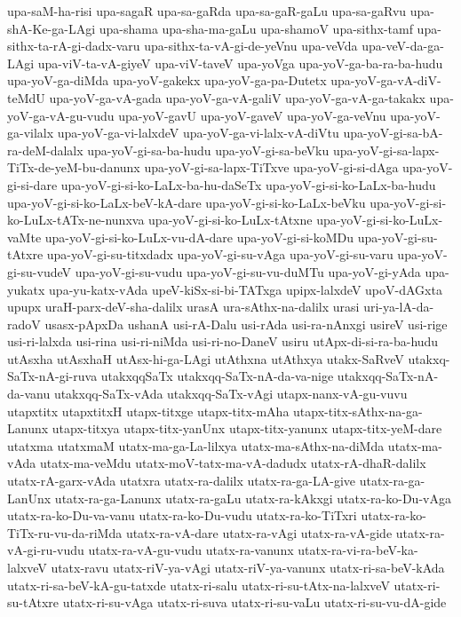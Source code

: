 {upa-saM-ha-risi
upa-sagaR
upa-sa-gaRda
upa-sa-gaR-gaLu
upa-sa-gaRvu
upa-shA-Ke-ga-LAgi
upa-shama
upa-sha-ma-gaLu
upa-shamoV
upa-sithx-tamf
upa-sithx-ta-rA-gi-dadx-varu
upa-sithx-ta-vA-gi-de-yeVnu
upa-veVda
upa-veV-da-ga-LAgi
upa-viV-ta-vA-giyeV
upa-viV-taveV
upa-yoVga
upa-yoV-ga-ba-ra-ba-hudu
upa-yoV-ga-diMda
upa-yoV-gakekx
upa-yoV-ga-pa-Dutetx
upa-yoV-ga-vA-diV-teMdU
upa-yoV-ga-vA-gada
upa-yoV-ga-vA-galiV
upa-yoV-ga-vA-ga-takakx
upa-yoV-ga-vA-gu-vudu
upa-yoV-gavU
upa-yoV-gaveV
upa-yoV-ga-veVnu
upa-yoV-ga-vilalx
upa-yoV-ga-vi-lalxdeV
upa-yoV-ga-vi-lalx-vA-diVtu
upa-yoV-gi-sa-bA-ra-deM-dalalx
upa-yoV-gi-sa-ba-hudu
upa-yoV-gi-sa-beVku
upa-yoV-gi-sa-lapx-TiTx-de-yeM-bu-danunx
upa-yoV-gi-sa-lapx-TiTxve
upa-yoV-gi-si-dAga
upa-yoV-gi-si-dare
upa-yoV-gi-si-ko-LaLx-ba-hu-daSeTx
upa-yoV-gi-si-ko-LaLx-ba-hudu
upa-yoV-gi-si-ko-LaLx-beV-kA-dare
upa-yoV-gi-si-ko-LaLx-beVku
upa-yoV-gi-si-ko-LuLx-tATx-ne-nunxva
upa-yoV-gi-si-ko-LuLx-tAtxne
upa-yoV-gi-si-ko-LuLx-vaMte
upa-yoV-gi-si-ko-LuLx-vu-dA-dare
upa-yoV-gi-si-koMDu
upa-yoV-gi-su-tAtxre
upa-yoV-gi-su-titxdadx
upa-yoV-gi-su-vAga
upa-yoV-gi-su-varu
upa-yoV-gi-su-vudeV
upa-yoV-gi-su-vudu
upa-yoV-gi-su-vu-duMTu
upa-yoV-gi-yAda
upa-yukatx
upa-yu-katx-vAda
upeV-kiSx-si-bi-TATxga
upipx-lalxdeV
upoV-dAGxta
upupx
uraH-parx-deV-sha-dalilx
urasA
ura-sAthx-na-dalilx
urasi
uri-ya-lA-da-radoV
usasx-pApxDa
ushanA
usi-rA-Dalu
usi-rAda
usi-ra-nAnxgi
usireV
usi-rige
usi-ri-lalxda
usi-rina
usi-ri-niMda
usi-ri-no-DaneV
usiru
utApx-di-si-ra-ba-hudu
utAsxha
utAsxhaH
utAsx-hi-ga-LAgi
utAthxna
utAthxya
utakx-SaRveV
utakxq-SaTx-nA-gi-ruva
utakxqqSaTx
utakxqq-SaTx-nA-da-va-nige
utakxqq-SaTx-nA-da-vanu
utakxqq-SaTx-vAda
utakxqq-SaTx-vAgi
utapx-nanx-vA-gu-vuvu
utapxtitx
utapxtitxH
utapx-titxge
utapx-titx-mAha
utapx-titx-sAthx-na-ga-Lanunx
utapx-titxya
utapx-titx-yanUnx
utapx-titx-yanunx
utapx-titx-yeM-dare
utatxma
utatxmaM
utatx-ma-ga-La-lilxya
utatx-ma-sAthx-na-diMda
utatx-ma-vAda
utatx-ma-veMdu
utatx-moV-tatx-ma-vA-dadudx
utatx-rA-dhaR-dalilx
utatx-rA-garx-vAda
utatxra
utatx-ra-dalilx
utatx-ra-ga-LA-give
utatx-ra-ga-LanUnx
utatx-ra-ga-Lanunx
utatx-ra-gaLu
utatx-ra-kAkxgi
utatx-ra-ko-Du-vAga
utatx-ra-ko-Du-va-vanu
utatx-ra-ko-Du-vudu
utatx-ra-ko-TiTxri
utatx-ra-ko-TiTx-ru-vu-da-riMda
utatx-ra-vA-dare
utatx-ra-vAgi
utatx-ra-vA-gide
utatx-ra-vA-gi-ru-vudu
utatx-ra-vA-gu-vudu
utatx-ra-vanunx
utatx-ra-vi-ra-beV-ka-lalxveV
utatx-ravu
utatx-riV-ya-vAgi
utatx-riV-ya-vanunx
utatx-ri-sa-beV-kAda
utatx-ri-sa-beV-kA-gu-tatxde
utatx-ri-salu
utatx-ri-su-tAtx-na-lalxveV
utatx-ri-su-tAtxre
utatx-ri-su-vAga
utatx-ri-suva
utatx-ri-su-vaLu
utatx-ri-su-vu-dA-gide
}
